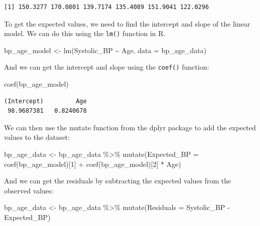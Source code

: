 \documentclass[
  letterpaper,
  8pt,
  a4paper]{book}
\newenvironment{Shaded}{\begin{snugshade}}{\end{snugshade}}
\newcommand{\AttributeTok}[1]{\textcolor[rgb]{0.40,0.45,0.13}{#1}}
\newcommand{\DecValTok}[1]{\textcolor[rgb]{0.68,0.00,0.00}{#1}}
\newcommand{\FunctionTok}[1]{\textcolor[rgb]{0.28,0.35,0.67}{#1}}
\newcommand{\NormalTok}[1]{\textcolor[rgb]{0.00,0.23,0.31}{#1}}
\newcommand{\OtherTok}[1]{\textcolor[rgb]{0.00,0.23,0.31}{#1}}
\newcommand{\SpecialCharTok}[1]{\textcolor[rgb]{0.37,0.37,0.37}{#1}}
\begin{document}
\begin{verbatim}
[1] 150.3277 170.0801 139.7174 135.4089 151.9041 122.0296
\end{verbatim}

To get the expected values, we need to find the intercept and slope of
the linear model. We can do this using the \texttt{lm()} function in R.

\begin{Shaded}
\begin{Highlighting}[]
\NormalTok{bp\_age\_model }\OtherTok{\textless{}{-}} \FunctionTok{lm}\NormalTok{(Systolic\_BP }\SpecialCharTok{\textasciitilde{}}\NormalTok{ Age, }\AttributeTok{data =}\NormalTok{ bp\_age\_data)}
\end{Highlighting}
\end{Shaded}

And we can get the intercept and slope using the \texttt{coef()}
function:

\begin{Shaded}
\begin{Highlighting}[]
\FunctionTok{coef}\NormalTok{(bp\_age\_model)}
\end{Highlighting}
\end{Shaded}

\begin{verbatim}
(Intercept)         Age 
 98.9687381   0.8240678 
\end{verbatim}

We can then use the mutate function from the dplyr package to add the
expected values to the dataset:

\begin{Shaded}
\begin{Highlighting}[]
\NormalTok{bp\_age\_data }\OtherTok{\textless{}{-}}\NormalTok{ bp\_age\_data }\SpecialCharTok{\%\textgreater{}\%}
  \FunctionTok{mutate}\NormalTok{(}\AttributeTok{Expected\_BP =} \FunctionTok{coef}\NormalTok{(bp\_age\_model)[}\DecValTok{1}\NormalTok{] }\SpecialCharTok{+} \FunctionTok{coef}\NormalTok{(bp\_age\_model)[}\DecValTok{2}\NormalTok{] }\SpecialCharTok{*}\NormalTok{ Age)}
\end{Highlighting}
\end{Shaded}

And we can get the residuals by subtracting the expected values from the
observed values:

\begin{Shaded}
\begin{Highlighting}[]
\NormalTok{bp\_age\_data }\OtherTok{\textless{}{-}}\NormalTok{ bp\_age\_data }\SpecialCharTok{\%\textgreater{}\%}
  \FunctionTok{mutate}\NormalTok{(}\AttributeTok{Residuals =}\NormalTok{ Systolic\_BP }\SpecialCharTok{{-}}\NormalTok{ Expected\_BP)}
\end{Highlighting}
\end{Shaded}
\end{document}
